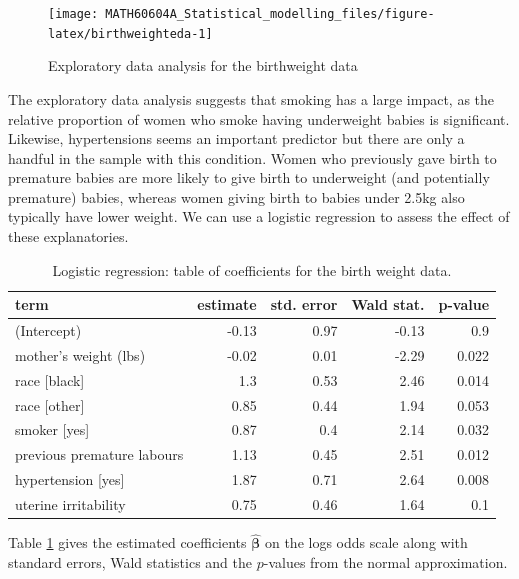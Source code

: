 \documentclass[
  11pt,
  letterpaper,
]{book}
\theoremstyle{definition}
\theoremstyle{definition}
\theoremstyle{definition}
\theoremstyle{remark}
\begin{document}
\begin{figure}

{\centering \texttt{[image: MATH60604A\_Statistical\_modelling\_files/figure-latex/birthweighteda-1]} 

}

\caption{Exploratory data analysis for the birthweight data}\label{fig:birthweighteda}
\end{figure}

The exploratory data analysis suggests that smoking has a large impact, as the relative proportion of women who smoke having underweight babies is significant. Likewise, hypertensions seems an important predictor but there are only a handful in the sample with this condition. Women who previously gave birth to premature babies are more likely to give birth to underweight (and potentially premature) babies, whereas women giving birth to babies under 2.5kg also typically have lower weight. We can use a logistic regression to assess the effect of these explanatories.

\begin{table}

\caption{\label{tab:logistibirthwgt}Logistic regression: table of coefficients for the birth weight data.}
\centering
\begin{tabular}[t]{lrrrr}
\toprule
term & estimate & std. error & Wald stat. & p-value\\
\midrule
(Intercept) & -0.13 & 0.97 & -0.13 & 0.9\\
mother's weight (lbs) & -0.02 & 0.01 & -2.29 & 0.022\\
race [black] & 1.3 & 0.53 & 2.46 & 0.014\\
race [other] & 0.85 & 0.44 & 1.94 & 0.053\\
smoker [yes] & 0.87 & 0.4 & 2.14 & 0.032\\
\addlinespace
previous premature labours & 1.13 & 0.45 & 2.51 & 0.012\\
hypertension [yes] & 1.87 & 0.71 & 2.64 & 0.008\\
uterine irritability & 0.75 & 0.46 & 1.64 & 0.1\\
\bottomrule
\end{tabular}
\end{table}

Table \ref{tab:logistibirthwgt} gives the estimated coefficients \(\widehat{\boldsymbol{\beta}}\) on the logs odds scale along with standard errors, Wald statistics and the \(p\)-values from the normal approximation.
\end{document}
